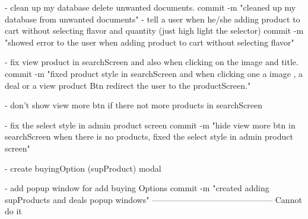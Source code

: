 - clean up my database delete unwanted documents.
      commit -m "cleaned up my database from unwanted documents"
-  tell a user when he/she adding product to cart without 
selecting flavor and quantity (just high light the selector)
      commit -m "showed error to the user when adding product to cart without selecting flavor"

-   fix view product in searchScreen and also when clicking on the image and title.
      commit -m "fixed product style in searchScreen and when clicking one a image , a deal or a view product Btn redirect the user to the productScreen."

-   don't show view more btn if there not more products in searchScreen

-   fix the select style in admin product screen
      commit -m "hide view more btn in searchScreen when there is no products, fixed the select style in admin product screen"

-   create buyingOption (supProduct) modal 

-   add popup window for add buying Options
      commit -m "created adding supProducts and deals popup windows" 
--------------------------------------------
Cannot do it
